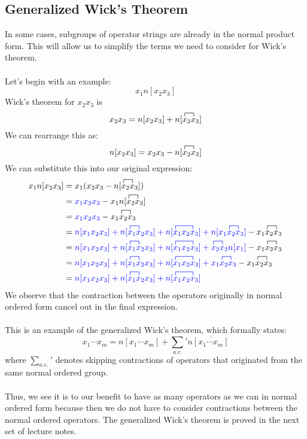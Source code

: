 \documentclass{article}
\newcommand{\ol}{\overline}
\newcommand{\cd}{\ensuremath{\cdots} }
\begin{document}
\subsection{Generalized Wick's Theorem}
In some cases, subgroups of operator strings are already in the normal product form.
This will allow us to simplify the terms we need to consider for Wick's theorem. \\ \\
Let's begin with an example: 
\[x_1 n[x_2 x_3] \] 
Wick's theorem for $x_2 x_3$ is
\[ x_2 x_3 = n[x_2 x_3] +   n[\contraction{}{x}{{}_2}{x} x_2 x_3] \]
We can rearrange this as: 
\[n[x_2 x_3]  = x_2 x_3  - n[\contraction{}{x}{{}_2}{x} x_2 x_3]  \]
We can substitute this into our original expression: 
\begin{align*}
x_1 n[x_2 x_3] &= x_1 (x_2 x_3  - n[\contraction{}{x}{{}_2}{x} x_2 x_3] ) \\
&= {\color{blue} x_1 x_2 x_3} - x_1n[\contraction{}{x}{{}_2}{x} x_2 x_3] \\
&= {\color{blue} x_1 x_2 x_3} - x_1\contraction{}{x}{{}_2}{x} x_2 x_3 \\
&= {\color{blue} n[x_1x_2x_3] + n[\contraction{}{x}{{}_1}{x} x_1 x_2 x_3] +n[\contraction{}{x}{{}_1 x_2}{x} x_1 x_2 x_3] + n[\contraction{x_1}{x}{{}_2}{x} x_1 x_2 x_3] }  - x_1\contraction{}{x}{{}_2}{x} x_2 x_3 \\
&=  {\color{blue} n[x_1x_2x_3] + n[\contraction{}{x}{{}_1}{x} x_1 x_2 x_3] +n[\contraction{}{x}{{}_1 x_2}{x} x_1 x_2 x_3] + \contraction{}{x}{{}_2}{x} x_2 x_3 n[x_1] }  - x_1\contraction{}{x}{{}_2}{x} x_2 x_3 \\
&= {\color{blue} n[x_1x_2x_3] + n[\contraction{}{x}{{}_1}{x} x_1 x_2 x_3] +n[\contraction{}{x}{{}_1 x_2}{x} x_1 x_2 x_3] + x_1\contraction{}{x}{{}_2}{x} x_2 x_3  }  - x_1\contraction{}{x}{{}_2}{x} x_2 x_3 \\
&= \color{blue} n[x_1x_2x_3] + n[\contraction{}{x}{{}_1}{x} x_1 x_2 x_3] +n[\contraction{}{x}{{}_1 x_2}{x} x_1 x_2 x_3] 
\end{align*}
We observe that the contraction between the operators originally in normal ordered form cancel out in the final expression.
\\ \\
This is an example of the generalized Wick's theorem, which formally states: 
$$x_1 \cd x_m = n[x_1 \cd x_m ]  + \sum_{a.c.} {}' n\ol{[x_1 \cd x_m ]} $$
where $\sum_{a.c.} {}' $ denotes skipping contractions of operators that originated from the same normal ordered group. 
\\ \\
Thus, we see it is to our benefit to have as many operators as we can in normal ordered form because then we do not have to consider contractions between the normal ordered operators. 
The generalized Wick's theorem is proved in the next set of lecture notes.
\end{document}
